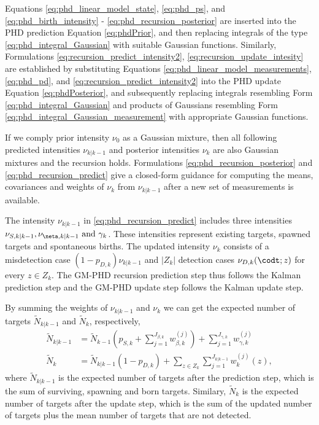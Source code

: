Equations \eqref{eq:phd_linear_model_state}, \eqref{eq:phd_ps}, and \eqref{eq:phd_birth_intensity} - \eqref{eq:phd_recursion_posterior} are inserted into the PHD prediction Equation \eqref{eq:phdPrior}, and then replacing
integrals of the type \eqref{eq:phd_integral_Gaussian} with suitable Gaussian functions. Similarly, Formulations \eqref{eq:recursion_predict_intensity2}, \eqref{eq:recursion_update_intesity} are established by substituting Equations \eqref{eq:phd_linear_model_measurements}, \eqref{eq:phd_pd}, and \eqref{eq:recursion_predict_intensity2} into the PHD update Equation \eqref{eq:phdPosterior}, and subsequently replacing integrals resembling Form \eqref{eq:phd_integral_Gaussian} and products of Gaussians resembling Form \eqref{eq:phd_integral_Gaussian_measurement} with appropriate Gaussian functions.

If we comply prior intensity $\nu_0$ as a Gaussian mixture, then all following predicted intensities $\nu_{k|k-1}$ and posterior intensities $\nu_k$ are also Gaussian mixtures and the recursion holds. Formulations \eqref{eq:phd_recursion_posterior} and \eqref{eq:phd_recursion_predict} give a closed-form guidance for computing the means, covariances and weights of $\nu_k$ from $\nu_{k|k-1}$ after a new set of measurements is available.

The intensity $\nu_{k|k-1}$ in \eqref{eq:phd_recursion_predict} includes three intensities $\nu_{S,k|k-1}, \nu_{\neta,k|k-1} \text{ and } \gamma_k$. These intensities represent existing targets, spawned targets and spontaneous births. The updated intensity $\nu_k$ consists of a misdetection case $(1-p_{D,k})\nu_{k|k-1}$ and $|Z_k|$ detection cases $\nu_{D,k}(\codt;z)$ for every $z \in Z_k$. The GM-PHD recursion prediction step thus follows the Kalman prediction step and the GM-PHD update step follows the Kalman update step.

By summing the weights of $\nu_{k|k-1}$ and $\nu_k$ we can get the expected number of targets $\tilde{N}_{k|k-1}$ and $\tilde{N}_k$, respectively,
\begin{align}
    \tilde{N}_{k|k-1} &=\tilde{N}_{k-1} \left( p_{S,k} + \sum_{j=1}^{J_{\beta,k}} w_{\beta,k}^{(j)} \right) + \sum_{j=1}^{J_{\gamma,k}} w_{\gamma,k}^{(j)} \\
    \tilde{N}_k &= \tilde{N}_{k|k-1} (1 - p_{D,k}) + \sum_{z \in Z_k} \sum_{j=1}^{J_{k|k-1}} w_k^{(j)}(z),
\end{align}
where $\tilde{N}_{k|k-1}$ is the expected number of targets after the prediction step, which is the sum of surviving, spawning and born targets. Similary, $\tilde{N}_k$ is the expected number of targets after the update step, which is the sum of the updated number of targets plus the mean number of targets
that are not detected.

